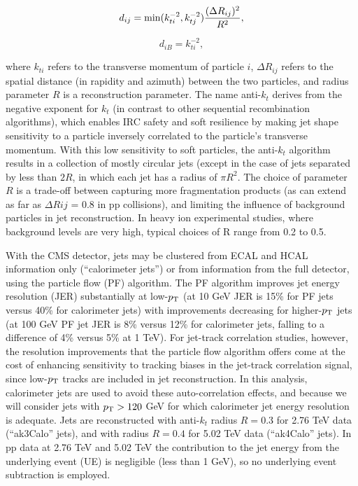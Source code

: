 \begin{equation}
\label{eq:a_kt1}
d_{ij} = {\rm min}(k_{ti}^{-2},k_{tj}^{-2})\frac{(\Delta R_{ij})^{2}}{R^{2}}, 
\end{equation}

\begin{equation}
\label{eq:a_kt2}
d_{iB} = k_{ti}^{-2},
\end{equation}

\noindent where $k_{ti}$ refers to the transverse momentum of particle $i$, $\Delta R_{ij}$ refers to the spatial distance (in rapidity and azimuth) between the two particles, and radius parameter $R$ is a reconstruction parameter.  The name anti-$k_{t}$ derives from the negative exponent for $k_{t}$ (in contrast to other sequential recombination algorithms), which enables IRC safety and soft resilience by making jet shape sensitivity to a particle inversely correlated to the particle's transverse momentum.  With this low sensitivity to soft particles, the anti-$k_{t}$ algorithm results in a collection of mostly circular jets (except in the case of jets separated by less than $2R$, in which each jet has a radius of $\pi R^{2}$.  The choice of parameter $R$ is a trade-off between capturing more fragmentation products (as can extend as far as $\Delta R{ij}$ = 0.8 in pp collisions), and limiting the influence of background particles in jet reconstruction.  In heavy ion experimental studies, where background levels are very high, typical choices of R range from 0.2 to 0.5.  

With the CMS detector, jets may be clustered from ECAL and HCAL information only (``calorimeter jets'') or from information from the full detector, using the particle flow (PF) algorithm.  The PF algorithm improves jet energy resolution (JER) substantially at low-$p_{\rm T}$ (at 10 GeV JER is 15\% for PF jets versus 40\% for calorimeter jets) with improvements decreasing for higher-$p_{\rm T}$ jets (at 100 GeV PF jet JER is 8\% versus 12\% for calorimeter jets, falling to a difference of 4\% versus 5\% at 1 TeV).  For jet-track correlation studies, however, the resolution improvements that the particle flow algorithm offers come at the cost of enhancing sensitivity to tracking biases in the jet-track correlation signal, since low-$p_{\rm T}$ tracks are included in jet reconstruction.  In this analysis, calorimeter jets are used to avoid these auto-correlation effects, and because we will consider jets with $p_{\rm T} > 120$ GeV for which calorimeter jet energy resolution is adequate.  Jets are reconstructed with anti-$k_{t}$ radius $R = 0.3$ for 2.76 TeV data (``ak3Calo'' jets), and with radius $R = 0.4$ for 5.02 TeV data (``ak4Calo'' jets).  In pp data at 2.76 TeV and 5.02 TeV the contribution to the jet energy from the underlying event (UE) is negligible (less than 1 GeV), so no underlying event subtraction is employed.
 
